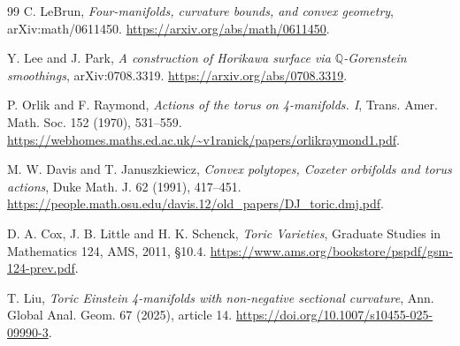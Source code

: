 \documentclass[a4paper,11pt]{article}
\numberwithin{equation}{section}
\theoremstyle{definition}
\begin{document}
\begin{thebibliography}{99}
 C. LeBrun,
\emph{Four-manifolds, curvature bounds, and convex geometry},
arXiv:math/0611450. \url{https://arxiv.org/abs/math/0611450}.

 Y. Lee and J. Park,
\emph{A construction of Horikawa surface via $\mathbb Q$-Gorenstein smoothings},
arXiv:0708.3319. \url{https://arxiv.org/abs/0708.3319}.

 P. Orlik and F. Raymond,
\emph{Actions of the torus on 4-manifolds. I}, Trans. Amer. Math. Soc. 152 (1970), 531--559.
\url{https://webhomes.maths.ed.ac.uk/~v1ranick/papers/orlikraymond1.pdf}.

 M. W. Davis and T. Januszkiewicz,
\emph{Convex polytopes, Coxeter orbifolds and torus actions}, Duke Math. J. 62 (1991), 417--451.
\url{https://people.math.osu.edu/davis.12/old_papers/DJ_toric.dmj.pdf}.

 D. A. Cox, J. B. Little and H. K. Schenck,
\emph{Toric Varieties}, Graduate Studies in Mathematics 124, AMS, 2011, \S10.4.
\url{https://www.ams.org/bookstore/pspdf/gsm-124-prev.pdf}.

 T. Liu,
\emph{Toric Einstein 4-manifolds with non-negative sectional curvature},
Ann. Global Anal. Geom. 67 (2025), article 14.
\url{https://doi.org/10.1007/s10455-025-09990-3}.

\end{thebibliography}
\end{document}
